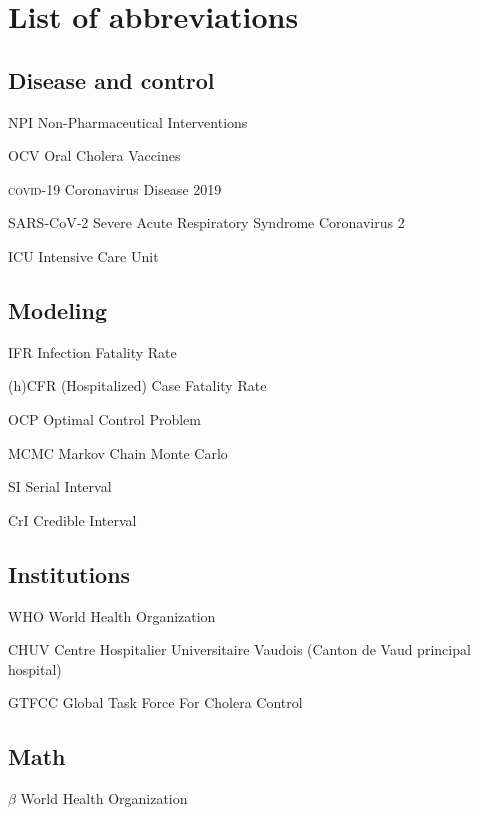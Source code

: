 \chapter*{List of abbreviations}
\begin{fullwidth}
	
\section{Disease and control}
\begin{abbreviations}
    \item[NPI] Non-Pharmaceutical Interventions
    \item[OCV] Oral Cholera Vaccines
    \item[\textsc{covid}-19] Coronavirus Disease 2019
    \item[SARS‑CoV‑2] Severe Acute Respiratory Syndrome Coronavirus 2
     \item[ICU] Intensive Care Unit
\end{abbreviations}
\section{Modeling}
\begin{abbreviations}
        \item[IFR] Infection Fatality Rate
     \item[(h)CFR] (Hospitalized) Case Fatality Rate
     \item[OCP] Optimal Control Problem
     \item[MCMC] Markov Chain Monte Carlo
     \item[SI] Serial Interval
    \item[CrI] Credible Interval
     \end{abbreviations}
\section{Institutions}
\begin{abbreviations}
    \item[WHO] World Health Organization
     \item[CHUV] Centre Hospitalier Universitaire Vaudois (Canton de Vaud principal hospital)
     \item[GTFCC] Global Task Force For Cholera Control
     \end{abbreviations}


\section{Math}
\begin{abbreviations}
    \item[$\beta$] World Health Organization
     \end{abbreviations}
\end{fullwidth}

